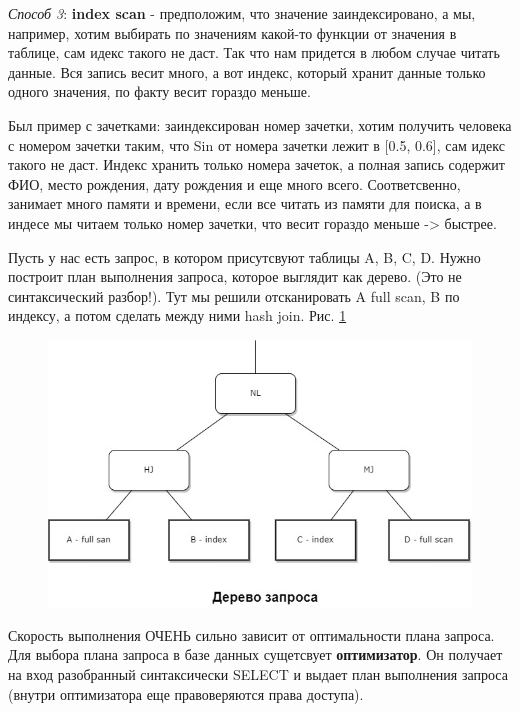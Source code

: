 \begin{enumerate}
\textit{Способ 3}: \textbf{index scan} - предположим, что значение заиндексировано, а мы, например, хотим выбирать по значениям какой-то функции от значения в таблице, сам идекс такого не даст. Так что нам придется в любом случае читать данные. Вся запись весит много, а вот индекс, который хранит данные только одного значения, по факту весит гораздо меньше. 

Был пример с зачетками: заиндексирован номер зачетки, хотим получить человека с номером зачетки таким, что Sin от номера зачетки лежит в [0.5, 0.6], сам идекс такого не даст. Индекс хранить только номера зачеток, а полная запись содержит ФИО, место рождения, дату рождения и еще много всего. Соответсвенно, занимает много памяти и времени, если все читать из памяти для поиска, а в индесе мы читаем только номер зачетки, что весит гораздо меньше -> быстрее. 


\end{enumerate}


Пусть у нас есть запрос, в котором присутсвуют таблицы A, B, C, D. Нужно построит план выполнения запроса, которое выглядит как дерево. (Это не синтаксический разбор!). Тут мы решили отсканировать A full scan, B по индексу, а потом сделать между ними hash join. Рис. \ref{fig:plan1}

\begin{figure}[h!]
    \centering
    \includegraphics[scale = 0.5]{5/plan.jpg}
    \label{fig:plan1}
    \caption{}
\end{figure}

Скорость выполнения ОЧЕНЬ сильно зависит от оптимальности плана запроса.
\\[20pt]
Для выбора плана запроса в базе данных сущетсвует \textbf{оптимизатор}. Он получает на вход разобранный синтаксически SELECT и выдает план выполнения запроса (внутри оптимизатора еще правоверяются права доступа). 

